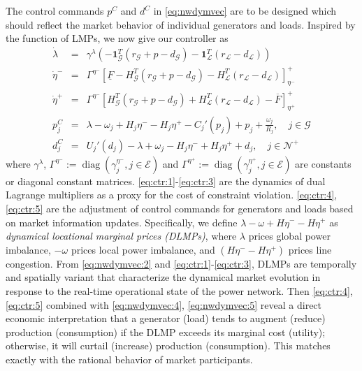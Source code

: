 \documentclass[journal,12pt,onecolumn,draftclsnofoot]{IEEEtran}
\newcommand{\diag}{\mathop{\mathrm{diag}}}
\begin{document}
The control commands $p^C$ and $d^C$ in \eqref{eq:nwdymvec} are to be designed which should reflect the market behavior of individual generators and loads. Inspired by the function of LMPs, we now give our controller as 
\begin{subequations}
	\begin{eqnarray}
	\label{eq:ctr:1}
	\dot \lambda & = & \gamma^\lambda \left( - \mathbf 1^T_\mathcal{G} (r_\mathcal{G}+p-d_\mathcal{G})  - \mathbf 1^T_\mathcal{L} (r_\mathcal{L}-d_\mathcal{L}) \right) \\
	\label{eq:ctr:2}
	\dot \eta^- & = & \Gamma^{\eta^-} \left[\underline{F} - H^T_{\mathcal{G}}(r_\mathcal{G}+p-d_\mathcal{G}) - H^T_\mathcal{L}(r_\mathcal{L}-d_\mathcal{L})  \right]^+_{\eta^-}   \\
	\label{eq:ctr:3}
	\dot \eta^+ & = & \Gamma^{\eta^-} \left[ H^T_{\mathcal{G}}(r_\mathcal{G}+p-d_\mathcal{G}) + H^T_\mathcal{L}(r_\mathcal{L}-d_\mathcal{L}) - \overline{F}  \right]^+_{\eta^+}   \\	
	\label{eq:ctr:4}
	 p_j^C  & =&	   \lambda -  \omega_j   +  H_j \eta^- - H_j \eta^+ - C_j'(p_j)    + p_j+\frac{\omega_j }{R_j}  ,\quad j\in\mathcal{G}  \\
	\label{eq:ctr:5}
	 d_j^C & = &  U_j'(d_j)  -  \lambda +  \omega_j - H_j \eta^- +  H_j\eta^+    + d_j, \quad  j\in\mathcal{N}^+
	\end{eqnarray}\label{eq:ctr}%
\end{subequations}
where $\gamma^\lambda$, $ \Gamma^{\eta^{-}}:=\diag(\gamma_j^{\eta^-}, j\in\mathcal{E})$ and $ \Gamma^{\eta^{+}}:=\diag(\gamma_j^{\eta^+}, j\in\mathcal{E})$ are constants or diagonal constant matrices. \eqref{eq:ctr:1}-\eqref{eq:ctr:3} are the dynamics of dual Lagrange multipliers as a proxy for the cost of constraint violation. \eqref{eq:ctr:4}, \eqref{eq:ctr:5} are the adjustment of control commands for generators and loads based on market information updates. Specifically, we define $\lambda - \omega +H \eta^- - H\eta^+$ as \emph{dynamical locational marginal prices (DLMPs)}, where $\lambda$ prices global power imbalance, $-\omega$ prices local power imbalance, and $(H \eta^- - H\eta^+)$ prices line congestion. From \eqref{eq:nwdymvec:2} and \eqref{eq:ctr:1}-\eqref{eq:ctr:3}, DLMPs are temporally and spatially variant that characterize the dynamical market evolution in response to the real-time operational state of the power network. Then \eqref{eq:ctr:4}, \eqref{eq:ctr:5} combined with \eqref{eq:nwdymvec:4}, \eqref{eq:nwdymvec:5} reveal a direct economic interpretation that a generator (load) tends to augment (reduce) production (consumption) if the DLMP exceeds its marginal cost (utility); otherwise, it will curtail (increase) production (consumption). This matches exactly with the rational behavior of market participants.  
\end{document}
